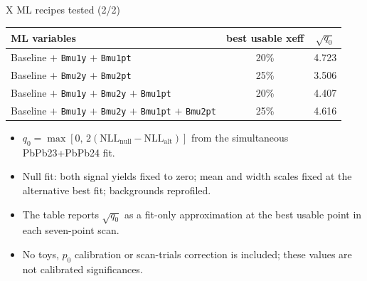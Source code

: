 \begin{frame}[label=p11]{X ML recipes tested (2/2)}
  \small
  \begin{center}
    \renewcommand{\arraystretch}{1.14}
    \setlength{\tabcolsep}{3pt}
    \begin{tabular}{p{}cc}
      \toprule
      ML variables & best usable xeff & $\sqrt{q_0}$ \\
      \midrule
      Baseline $+$ \texttt{Bmu1y} $+$ \texttt{Bmu1pt} & 20\% & 4.723 \\
      Baseline $+$ \texttt{Bmu2y} $+$ \texttt{Bmu2pt} & 25\% & 3.506 \\
      Baseline $+$ \texttt{Bmu1y} $+$ \texttt{Bmu2y} $+$ \texttt{Bmu1pt} & 20\% & 4.407 \\
      Baseline $+$ \texttt{Bmu1y} $+$ \texttt{Bmu2y} $+$ \texttt{Bmu1pt} $+$ \texttt{Bmu2pt} & 25\% & 4.616 \\
      \bottomrule
    \end{tabular}
  \end{center}

  \vspace{0.25em}
  \begin{itemize}
    \setlength{\itemsep}{0.10em}
    \item $q_0=\max\!\left[0,\,2\left(\mathrm{NLL}_{\mathrm{null}}-\mathrm{NLL}_{\mathrm{alt}}\right)\right]$ from the simultaneous PbPb23+PbPb24 fit.
    \item Null fit: both signal yields fixed to zero; mean and width scales fixed at the alternative best fit; backgrounds reprofiled.
    \item The table reports $\sqrt{q_0}$ as a fit-only approximation at the best usable point in each seven-point scan.
    \item No toys, $p_0$ calibration or scan-trials correction is included; these values are not calibrated significances.
  \end{itemize}
\end{frame}
